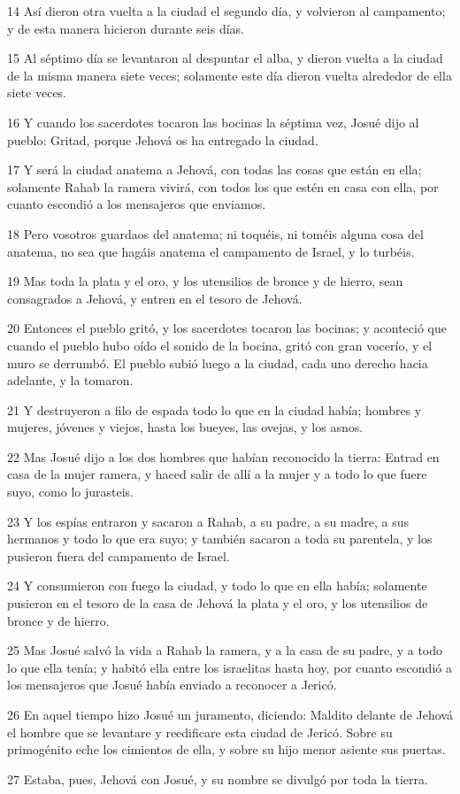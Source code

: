\par 14 Así dieron otra vuelta a la ciudad el segundo día, y volvieron al campamento; y de esta manera hicieron durante seis días.
\par 15 Al séptimo día se levantaron al despuntar el alba, y dieron vuelta a la ciudad de la misma manera siete veces; solamente este día dieron vuelta alrededor de ella siete veces.
\par 16 Y cuando los sacerdotes tocaron las bocinas la séptima vez, Josué dijo al pueblo: Gritad, porque Jehová os ha entregado la ciudad.
\par 17 Y será la ciudad anatema a Jehová, con todas las cosas que están en ella; solamente Rahab la ramera vivirá, con todos los que estén en casa con ella, por cuanto escondió a los mensajeros que enviamos.
\par 18 Pero vosotros guardaos del anatema; ni toquéis, ni toméis alguna cosa del anatema, no sea que hagáis anatema el campamento de Israel, y lo turbéis.
\par 19 Mas toda la plata y el oro, y los utensilios de bronce y de hierro, sean consagrados a Jehová, y entren en el tesoro de Jehová.
\par 20 Entonces el pueblo gritó, y los sacerdotes tocaron las bocinas; y aconteció que cuando el pueblo hubo oído el sonido de la bocina, gritó con gran vocerío, y el muro se derrumbó. El pueblo subió luego a la ciudad, cada uno derecho hacia adelante, y la tomaron.
\par 21 Y destruyeron a filo de espada todo lo que en la ciudad había; hombres y mujeres, jóvenes y viejos, hasta los bueyes, las ovejas, y los asnos.
\par 22 Mas Josué dijo a los dos hombres que habían reconocido la tierra: Entrad en casa de la mujer ramera, y haced salir de allí a la mujer y a todo lo que fuere suyo, como lo jurasteis.
\par 23 Y los espías entraron y sacaron a Rahab, a su padre, a su madre, a sus hermanos y todo lo que era suyo; y también sacaron a toda su parentela, y los pusieron fuera del campamento de Israel.
\par 24 Y consumieron con fuego la ciudad, y todo lo que en ella había; solamente pusieron en el tesoro de la casa de Jehová la plata y el oro, y los utensilios de bronce y de hierro.
\par 25 Mas Josué salvó la vida a Rahab la ramera, y a la casa de su padre, y a todo lo que ella tenía; y habitó ella entre los israelitas hasta hoy, por cuanto escondió a los mensajeros que Josué había enviado a reconocer a Jericó. 
\par 26 En aquel tiempo hizo Josué un juramento, diciendo: Maldito delante de Jehová el hombre que se levantare y reedificare esta ciudad de Jericó. Sobre su primogénito eche los cimientos de ella, y sobre su hijo menor asiente sus puertas. 
\par 27 Estaba, pues, Jehová con Josué, y su nombre se divulgó por toda la tierra.


